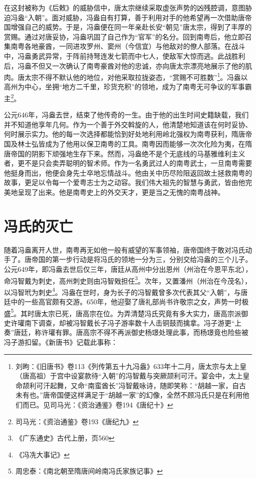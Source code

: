 在这封被称为《后敕》的威胁信中，唐太宗继续采取虚张声势的凶残腔调，意图胁迫冯盎“入朝”。面对威胁，冯盎自有打算，善于利用对手的他希望再一次借助唐帝国增强自己的威势。于是，冯盎便在同一年亲赴长安“朝见”唐太宗，得到了丰厚的赏赐。通过对唐妥协，冯盎巩固了自己作为“官军”的名分。回到南粤后，他立即召集南粤各地豪酋，一同进攻罗州、窦州（今信宜）与他敌对的僚人部落。在战斗中，冯盎勇武异常，于阵前持弩连发七箭而中七人，使敌军大惊而逃。此战胜利后，冯盎不但又一次确认了南粤豪酋对他的忠诚，亦向唐太宗漂亮地展示了他的肌肉。唐太宗不得不默认他的地位，对他采取拉拢姿态，“赏赐不可胜数”\footnote{刘昫：《旧唐书》卷113《列传第五十九冯盎》633年十二月，唐太宗与太上皇（唐高祖）于宫中设宴款待“入朝”的冯智戴与突厥颉利可汗。宴会中，太上皇命颉利可汗起舞，又命“南蛮酋长”冯智戴咏诗，随即笑称：“胡越一家，自古未有也。”唐帝国便这样满足于“胡越一家”的幻像，全然不顾冯氏只是在利用他们而已。见司马光：《资治通鉴》卷194《唐纪十》}。冯盎以高州为中心，坐拥“地方二千里，珍货充积”的领地，成为了南粤无可争议的军事霸主\footnote{司马光：《资治通鉴》卷193《唐纪九》}。

公元646年，冯盎去世，结束了他传奇的一生。由于他的出生时间史籍缺载，我们并不知道他享年几何。作为一个善于外交斡旋的人，他清楚地知道该在何时妥协、何时展示实力。他的每一次选择都能恰到好处地利用岭北强权为南粤获利，隋唐帝国及林士弘皆成为了他用以保卫南粤的工具。南粤因而能够一次次化险为夷，在隋唐帝国的阴影下顽强地生存下来。然而，冯盎绝不是个无底线的马基雅维利主义者，更不是只会卖弄聪明的智术师。作为一名勇武过人的南粤武士，一旦南粤需要他挺身而出，他便会身先士卒地忘情战斗。他由关中历尽险阻返回故土拯救南粤的故事，更足以令每一个爱粤志士为之动容。我们伟大祖先的智慧与勇武，皆由他完美地呈现了出来。他是南粤史上的外交天才，更是当之无愧的南粤战神。

\section{冯氏的灭亡}

\indent 随着冯盎离开人世，南粤再无如他一般有威望的军事领袖，唐帝国终于敢对冯氏动手了。唐帝国的第一步行动是将冯氏的领地一分为三，分别交给冯盎的三个儿子。公元649年，即冯盎去世后仅三年，唐廷从高州中分出恩州（州治在今恩平东北），命冯智戴为刺史，高州刺史则由冯智戣担任\footnote{《广东通史》古代上册，页560}。次年，又置潘州（州治在今茂名），以冯智玳为刺史\footnote{《冯冼大事记》}。冯盎在世时，身为长子的冯智戴曾多次代表其父“入朝”，与唐廷中的一些高官颇有交游。650年，他迎娶了唐礼部尚书许敬宗之女，声势一时极盛\footnote{周忠泰：《南北朝至隋唐间岭南冯氏家族记事》}。其时唐太宗已死，唐高宗在位。为弄清楚冯氏究竟有多大实力，唐高宗派御史许瓘南下调查，却被冯智戴长子冯子游率数十人击铜鼓而擒拿。冯子游更“上奏”唐廷，称许瓘有罪。唐高宗不得不再派御史杨璟处理此事，而杨璟竟也险些被冯子游扣留。《新唐书》记载此事称：

